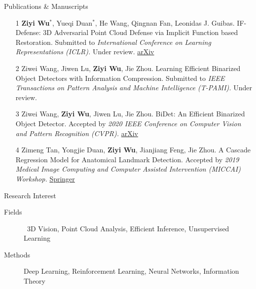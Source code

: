 \documentclass{resume} %
\begin{document}
\begin{rSection}{Publications \& Manuscripts}

\begin{enumerate}
\item[1] \textbf{Ziyi Wu}$^{*}$, Yueqi Duan$^{*}$, He Wang, Qingnan Fan, Leonidas J. Guibas. IF-Defense: 3D Adversarial Point Cloud Defense via Implicit Function based Restoration. Submitted to \textit{International Conference on Learning Representations (ICLR).} Under review. \href{https://arxiv.org/abs/2010.05272}{arXiv}
\item[2] Ziwei Wang, Jiwen Lu, \textbf{Ziyi Wu}, Jie Zhou. Learning Efficient Binarized Object Detectors with Information Compression. Submitted to \textit{IEEE Transactions on Pattern Analysis and Machine Intelligence (T-PAMI).} Under review.
\item[3] Ziwei Wang, \textbf{Ziyi Wu}, Jiwen Lu, Jie Zhou. BiDet: An Efficient Binarized Object Detector. Accepted by \textit{2020 IEEE Conference on Computer Vision and Pattern Recognition (CVPR).} \href{https://arxiv.org/abs/2003.03961}{arXiv}
\item[4] Zimeng Tan, Yongjie Duan, \textbf{Ziyi Wu}, Jianjiang Feng, Jie Zhou. A Cascade Regression Model for Anatomical Landmark Detection. Accepted by \textit{2019 Medical Image Computing and Computer Assisted Intervention (MICCAI) Workshop.} \href{https://link.springer.com/chapter/10.1007/978-3-030-39074-7_5}{Springer}
\end{enumerate}

\end{rSection}

\begin{rSection}{Research Interest}

\begin{description}
    \item[Fields] \quad\quad\, 
    3D Vision, 
    Point Cloud Analysis, 
    Efficient Inference, 
    Unsupervised Learning
    \item[Methods] \quad Deep Learning, Reinforcement Learning, Neural Networks, Information Theory
    \newline
\end{description}

\end{rSection}
\end{document}
